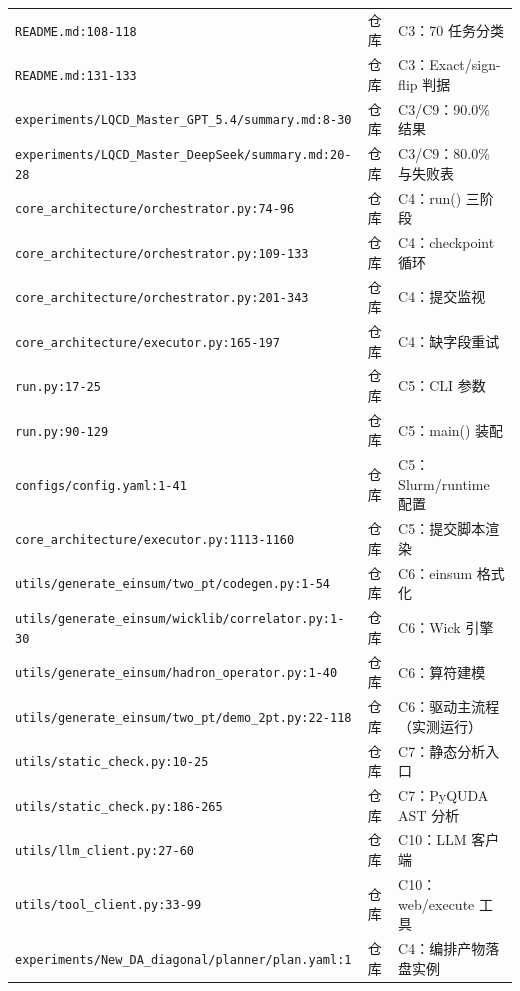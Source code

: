 \documentclass[UTF8]{ctexart}
\begin{document}
\begin{xltabular}{\textwidth}{XlX}
\texttt{\nolinkurl{README.md:108-118}} & 仓库 & C3：70 任务分类 \\
\texttt{\nolinkurl{README.md:131-133}} & 仓库 & C3：Exact/sign-flip 判据 \\
\texttt{\nolinkurl{experiments/LQCD_Master_GPT_5.4/summary.md:8-30}} & 仓库 & C3/C9：90.0\% 结果 \\
\texttt{\nolinkurl{experiments/LQCD_Master_DeepSeek/summary.md:20-28}} & 仓库 & C3/C9：80.0\% 与失败表 \\
\texttt{\nolinkurl{core_architecture/orchestrator.py:74-96}} & 仓库 & C4：run() 三阶段 \\
\texttt{\nolinkurl{core_architecture/orchestrator.py:109-133}} & 仓库 & C4：checkpoint 循环 \\
\texttt{\nolinkurl{core_architecture/orchestrator.py:201-343}} & 仓库 & C4：提交监视 \\
\texttt{\nolinkurl{core_architecture/executor.py:165-197}} & 仓库 & C4：缺字段重试 \\
\texttt{\nolinkurl{run.py:17-25}} & 仓库 & C5：CLI 参数 \\
\texttt{\nolinkurl{run.py:90-129}} & 仓库 & C5：main() 装配 \\
\texttt{\nolinkurl{configs/config.yaml:1-41}} & 仓库 & C5：Slurm/runtime 配置 \\
\texttt{\nolinkurl{core_architecture/executor.py:1113-1160}} & 仓库 & C5：提交脚本渲染 \\
\texttt{\nolinkurl{utils/generate_einsum/two_pt/codegen.py:1-54}} & 仓库 & C6：einsum 格式化 \\
\texttt{\nolinkurl{utils/generate_einsum/wicklib/correlator.py:1-30}} & 仓库 & C6：Wick 引擎 \\
\texttt{\nolinkurl{utils/generate_einsum/hadron_operator.py:1-40}} & 仓库 & C6：算符建模 \\
\texttt{\nolinkurl{utils/generate_einsum/two_pt/demo_2pt.py:22-118}} & 仓库 & C6：驱动主流程（实测运行） \\
\texttt{\nolinkurl{utils/static_check.py:10-25}} & 仓库 & C7：静态分析入口 \\
\texttt{\nolinkurl{utils/static_check.py:186-265}} & 仓库 & C7：PyQUDA AST 分析 \\
\texttt{\nolinkurl{utils/llm_client.py:27-60}} & 仓库 & C10：LLM 客户端 \\
\texttt{\nolinkurl{utils/tool_client.py:33-99}} & 仓库 & C10：web/execute 工具 \\
\texttt{\nolinkurl{experiments/New_DA_diagonal/planner/plan.yaml:1}} & 仓库 & C4：编排产物落盘实例 \\
\bottomrule
\end{xltabular}
\end{document}
